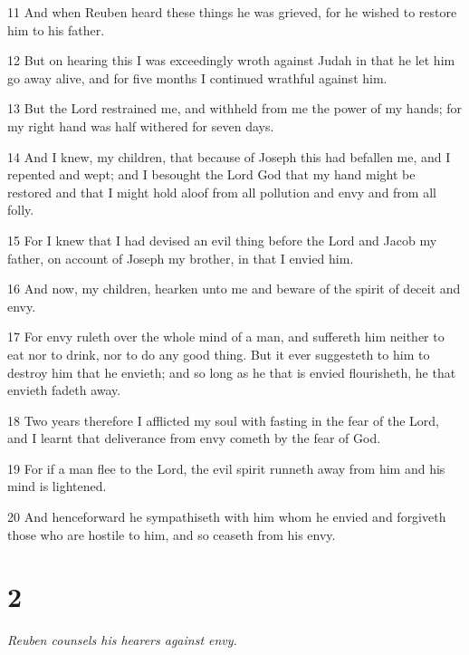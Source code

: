 \par 11 And when Reuben heard these things he was grieved, for he wished to restore him to his father.

\par 12 But on hearing this I was exceedingly wroth against Judah in that he let him go away alive, and for five months I continued wrathful against him.

\par 13 But the Lord restrained me, and withheld from me the power of my hands; for my right hand was half withered for seven days.

\par 14 And I knew, my children, that because of Joseph this had befallen me, and I repented and wept; and I besought the Lord God that my hand might be restored and that I might hold aloof from all pollution and envy and from all folly.

\par 15 For I knew that I had devised an evil thing before the Lord and Jacob my father, on account of Joseph my brother, in that I envied him.

\par 16 And now, my children, hearken unto me and beware of the spirit of deceit and envy.

\par 17 For envy ruleth over the whole mind of a man, and suffereth him neither to eat nor to drink, nor to do any good thing. But it ever suggesteth to him to destroy him that he envieth; and so long as he that is envied flourisheth, he that envieth fadeth away.

\par 18 Two years therefore I afflicted my soul with fasting in the fear of the Lord, and I learnt that deliverance from envy cometh by the fear of God.

\par 19 For if a man flee to the Lord, the evil spirit runneth away from him and his mind is lightened.

\par 20 And henceforward he sympathiseth with him whom he envied and forgiveth those who are hostile to him, and so ceaseth from his envy.



\chapter{2}

\par \textit{Reuben counsels his hearers against envy.}

